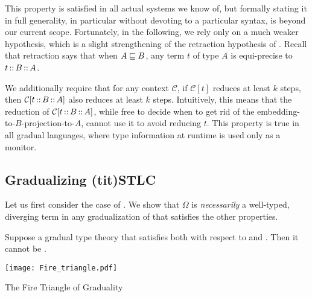 This property is satisfied in all actual systems we know of,
but formally stating it in full generality, in particular without devoting
to a particular syntax, is beyond our current scope.
Fortunately, in the following, we rely only on a much weaker hypothesis,
which is a slight strengthening of the retraction hypothesis of .
Recall that retraction says that when $A \sqsubseteq B$, any term $t$ of type $A$
is equi-precise to $t \operatorname{\mathord{:}:} B \operatorname{\mathord{:}:} A$.

We additionally require that for any context $\mathcal{C}$, if $\mathcal{C}[t]$
reduces at least $k$ steps, then $\mathcal{C}[t \operatorname{\mathord{:}:} B \operatorname{\mathord{:}:} A]$ also reduces at
least $k$ steps.
Intuitively, this means that the reduction of $\mathcal{C}[t \operatorname{\mathord{:}:} B \operatorname{\mathord{:}:} A]$,
while free to decide when to get rid of the embedding-to-$B$-projection-to-$A$,
cannot use it to avoid reducing $t$.
This property is true in all gradual languages,
where type information at runtime is used only as a monitor.

\subsection{Gradualizing \kl(tit){STLC}}
Let us first consider the case of .
We show that $\Omega$ is \emph{necessarily} a well-typed, diverging term in any
gradualization of  that satisfies the other properties.

\begin{minipage}{\textwidth}
\begin{theorem}
  \label{thm:triangle-STLC}

Suppose a gradual type theory that satisfies both  with respect to
 and . Then it cannot be .

\end{theorem}
\end{minipage}

\begin{marginfigure}[-4em]
  \texttt{[image: Fire\_triangle.pdf]}
  \caption{The Fire Triangle of Graduality}
\end{marginfigure}

